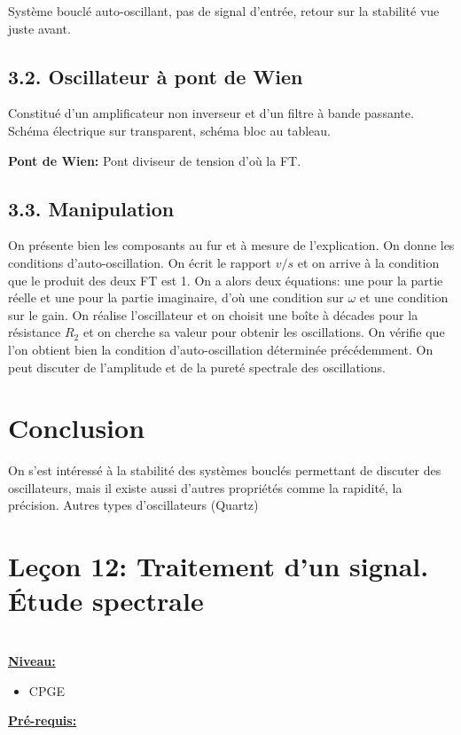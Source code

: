 \documentclass[french, a4paper, 10pt, twocolumn, landscape]{article}
\begin{document}
Système bouclé auto-oscillant, pas de signal d'entrée, retour sur la stabilité vue juste avant.

\subsection*{3.2. Oscillateur à pont de Wien}

Constitué d'un amplificateur non inverseur et d'un filtre à bande passante. Schéma électrique sur transparent, schéma bloc au tableau.\medskip

\textbf{Pont de Wien:} Pont diviseur de tension d'où la FT.

\subsection*{3.3. Manipulation}

On présente bien les composants au fur et à mesure de l'explication. On donne les conditions d'auto-oscillation. On écrit le rapport $v/s$ et on arrive à la condition que le produit des deux FT est 1. On a alors deux équations: une pour la partie réelle et une pour la partie imaginaire, d'où une condition sur $\omega$ et une condition sur le gain. On réalise l'oscillateur et on choisit une boîte à décades pour la résistance $R_2$ et on cherche sa valeur pour obtenir les oscillations. On vérifie que l'on obtient bien la condition d'auto-oscillation déterminée précédemment. On peut discuter de l'amplitude et de la pureté spectrale des oscillations.

\section*{Conclusion}

On s'est intéressé à la stabilité des systèmes bouclés permettant de discuter des oscillateurs, mais il existe aussi d'autres propriétés comme la rapidité, la précision. Autres types d'oscillateurs (Quartz)

\clearpage

\section*{Leçon 12: Traitement d'un signal. Étude spectrale}

\hrulefill\\

\noindent\underline{\textbf{Niveau:}}
\begin{itemize}
  \item CPGE 
\end{itemize}
\underline{\textbf{Pr{\'e}-requis: }}
\end{document}
